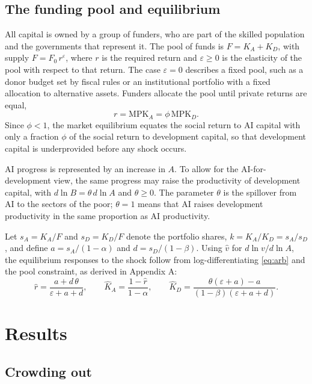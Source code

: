 \documentclass[AER]{AEA}
\newcommand{\sA}{s_A}
\newcommand{\sD}{s_D}
\begin{document}
\subsection{The funding pool and equilibrium}

All capital is owned by a group of funders, who are part of the skilled population and the governments that represent it. The pool of funds is $F=K_A+K_D$, with supply $F=F_0\,r^{\varepsilon}$, where $r$ is the required return and $\varepsilon\ge 0$ is the elasticity of the pool with respect to that return. The case $\varepsilon=0$ describes a fixed pool, such as a donor budget set by fiscal rules or an institutional portfolio with a fixed allocation to alternative assets. Funders allocate the pool until private returns are equal,
\begin{equation}\label{eq:arb}
r=\mathrm{MPK}_A=\phi\,\mathrm{MPK}_D .
\end{equation}
Since $\phi<1$, the market equilibrium equates the social return to AI capital with only a fraction $\phi$ of the social return to development capital, so that development capital is underprovided before any shock occurs.

AI progress is represented by an increase in $A$. To allow for the AI-for-development view, the same progress may raise the productivity of development capital, with $d\ln B=\theta\, d\ln A$ and $\theta\ge 0$. The parameter $\theta$ is the spillover from AI to the sectors of the poor; $\theta=1$ means that AI raises development productivity in the same proportion as AI productivity.

Let $\sA=K_A/F$ and $\sD=K_D/F$ denote the portfolio shares, $k=K_A/K_D=\sA/\sD$, and define $a=\sA/(1-\alpha)$ and $d=\sD/(1-\beta)$. Using $\hat{v}$ for $d\ln v/d\ln A$, the equilibrium responses to the shock follow from log-differentiating \eqref{eq:arb} and the pool constraint, as derived in Appendix A:
\begin{equation}\label{eq:rho}
\hat{r}=\frac{a+d\,\theta}{\varepsilon+a+d},\qquad
\hat{K}_A=\frac{1-\hat{r}}{1-\alpha},\qquad
\hat{K}_D=\frac{\theta(\varepsilon+a)-a}{(1-\beta)(\varepsilon+a+d)} .
\end{equation}

\section{Results}

\subsection{Crowding out}
\end{document}
